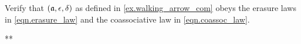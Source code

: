 \documentclass[Book-Poly]{subfiles}
\begin{document}
\begin{exercise} \label{exc.walking_arrow_com}
Verify that $(\mathfrak{a},\epsilon,\delta)$ as defined in \cref{ex.walking_arrow_com} obeys the erasure laws in \eqref{eqn.erasure_law} and the coassociative law in \eqref{eqn.coassoc_law}.
\begin{solution}
** %

\end{solution}
\end{exercise}
\end{document}
